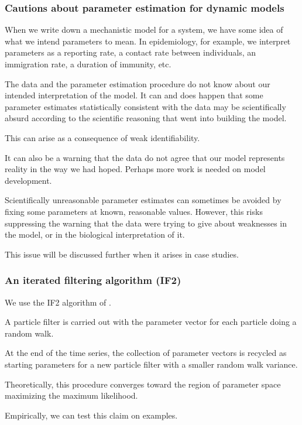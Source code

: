 \documentclass{beamer}\usepackage[]{graphicx}\usepackage[]{color}
\begin{document}
\begin{frame}[fragile]

\frametitle{Cautions about parameter estimation for dynamic models}

\bi
\item  When we write down a mechanistic model for a system, we have some idea of what we intend parameters to mean. In epidemiology, for example, we interpret parameters as  a reporting rate, a contact rate between individuals, an immigration rate, a duration of immunity, etc. 

\item  The data and the parameter estimation procedure do not know about our intended interpretation of the model. It can and does happen that some parameter estimates statistically consistent with the data may be scientifically absurd according to the scientific reasoning that went into building the model. 

\item  This can arise as a consequence of weak identifiability. 

\item  It can also be a warning that the data do not agree that our model represents reality in the way we had hoped. Perhaps more work is needed on model development.

\item  Scientifically unreasonable parameter estimates can sometimes be avoided by fixing some parameters at known, reasonable values. However, this risks suppressing the warning that the data were trying to give about weaknesses in the model, or in the biological interpretation of it.

\item  This issue will be discussed further when it arises in case studies.

\ei

\end{frame}  

\begin{frame}[fragile]

\frametitle{An iterated filtering algorithm (IF2)}

\bi

\item  We use the IF2 algorithm of \citep{ionides15}.

\item  A particle filter is carried out with the parameter vector for each particle doing a random walk.

\item  At the end of the time series, the collection of parameter vectors is recycled as starting parameters for a new particle filter with a smaller random walk variance.

\item  Theoretically, this procedure converges toward the region of parameter space maximizing the maximum likelihood.

\item  Empirically, we can test this claim on examples.
\ei

\end{frame}
\end{document}
